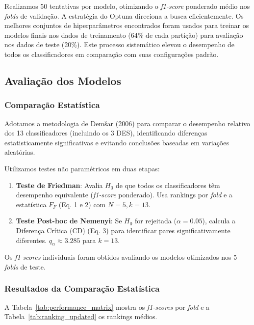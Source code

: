 \documentclass[12pt]{article}
\begin{document}
Realizamos 50 tentativas por modelo, otimizando o \textit{f1-score} ponderado médio nos \textit{folds} de validação. A estratégia do Optuna direciona a busca eficientemente. Os melhores conjuntos de hiperparâmetros encontrados foram usados para treinar os modelos finais nos dados de treinamento (64\% de cada partição) para avaliação nos dados de teste (20\%). Este processo sistemático elevou o desempenho de todos os classificadores em comparação com suas configurações padrão.

\subsection{Avaliação dos Modelos}

\subsubsection{Comparação Estatística} 

Adotamos a metodologia de Demšar (2006) \cite{demsarStatistical} para comparar o desempenho relativo dos 13 classificadores (incluindo os 3 DES), identificando diferenças estatisticamente significativas e evitando conclusões baseadas em variações aleatórias.

Utilizamos testes não paramétricos em duas etapas:
\begin{enumerate}
    \item \textbf{Teste de Friedman}: Avalia $H_0$ de que todos os classificadores têm desempenho equivalente (\textit{f1-score} ponderado). Usa rankings por \textit{fold} e a estatística $F_F$ (Eq. 1 e 2) com $N=5, k=13$.
    \item \textbf{Teste Post-hoc de Nemenyi}: Se $H_0$ for rejeitada ($\alpha=0.05$), calcula a Diferença Crítica (CD) (Eq. 3) para identificar pares significativamente diferentes. $q_\alpha \approx 3.285$ para $k=13$.
\end{enumerate}

Os \textit{f1-scores} individuais foram obtidos avaliando os modelos otimizados nos 5 \textit{folds} de teste.

\subsubsection{Resultados da Comparação Estatística}

A Tabela~\ref{tab:performance_matrix} mostra os \textit{f1-scores} por \textit{fold} e a Tabela~\ref{tab:ranking_updated} os rankings médios.
\end{document}
